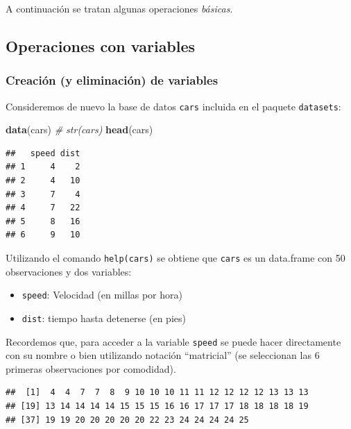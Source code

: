 \documentclass[
]{book}
\newenvironment{Shaded}{\begin{snugshade}}{\end{snugshade}}
\newcommand{\CommentTok}[1]{\textcolor[rgb]{0.56,0.35,0.01}{\textit{#1}}}
\newcommand{\FunctionTok}[1]{\textcolor[rgb]{0.13,0.29,0.53}{\textbf{#1}}}
\newcommand{\NormalTok}[1]{#1}
\newcommand{\SpecialCharTok}[1]{\textcolor[rgb]{0.81,0.36,0.00}{\textbf{#1}}}
\begin{document}
A continuación se tratan algunas operaciones \emph{básicas}.

\subsection{Operaciones con variables}\label{operaciones-con-variables}

\subsubsection{Creación (y eliminación) de variables}\label{creaciuxf3n-y-eliminaciuxf3n-de-variables}

Consideremos de nuevo la base de datos \texttt{cars} incluida en el paquete \texttt{datasets}:

\begin{Shaded}
\begin{Highlighting}[]
\FunctionTok{data}\NormalTok{(cars)}
\CommentTok{\# str(cars)}
\FunctionTok{head}\NormalTok{(cars)}
\end{Highlighting}
\end{Shaded}

\begin{verbatim}
##   speed dist
## 1     4    2
## 2     4   10
## 3     7    4
## 4     7   22
## 5     8   16
## 6     9   10
\end{verbatim}

Utilizando el comando \texttt{help(cars)} se obtiene que \texttt{cars} es un data.frame con 50
observaciones y dos variables:

\begin{itemize}
\item
  \texttt{speed}: Velocidad (en millas por hora)
\item
  \texttt{dist}: tiempo hasta detenerse (en pies)
\end{itemize}

Recordemos que, para acceder a la variable \texttt{speed} se puede
hacer directamente con su nombre o bien utilizando notación
``matricial'' (se seleccionan las 6 primeras observaciones por comodidad).

\begin{Shaded}
\end{Shaded}

\begin{verbatim}
##  [1]  4  4  7  7  8  9 10 10 10 11 11 12 12 12 12 13 13 13
## [19] 13 14 14 14 14 15 15 15 16 16 17 17 17 18 18 18 18 19
## [37] 19 19 20 20 20 20 20 22 23 24 24 24 24 25
\end{verbatim}
\end{document}
